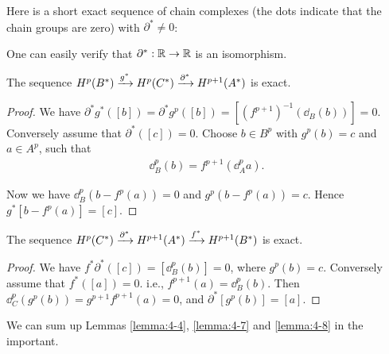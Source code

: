 \begin{example}\label{exampl:4-6}
  Here is a short exact sequence of chain complexes (the dots indicate
  that the chain groups are zero) with $\partial^*\neq 0$:

\begin{center}
\end{center}

One can easily verify that $\partial^*:\mathbb{R}\to\mathbb{R}$ is an isomorphism.
\end{example}


\begin{lemma}\label{lemma:4-7}
  The sequence $H^p(B^*)\xrightarrow[]{g^*} H^p(C^*)\xrightarrow[]{\partial^*}H^{p+1}(A^*)$ is exact.
\end{lemma}

\begin{proof}
  We have $\partial^*g^*([b]) = \partial^*g^p([b]) = [(f^{p+1})^{-1} (\dd_B(b))] = 0$. Conversely assume 
  that $\partial^*([c]) = 0$. Choose $b\in B^p$ with $g^p(b) = c$ and $a\in A^p$, such that 
  \begin{align*}
    \dd^p_B(b) = f^{p+1}(\dd^p_Aa).
  \end{align*}

  Now we have $\dd^p_B(b - f^p(a)) = 0$ and $g^p(b-f^p(a)) = c$. Hence $g^*[b-f^p(a)] = [c]$.
\end{proof}


\begin{lemma}\label{lemma:4-8}
  The sequence $H^p(C^*)\xrightarrow[]{\partial^*} H^{p+1}(A^*)\xrightarrow[]{f^*} H^{p+1}(B^*)$ is exact.
\end{lemma}

\begin{proof}
  We have $f^*\partial^*([c]) = [\dd^p_B(b)] = 0$, where $g^p(b) = c$. Conversely assume that $f^*([a]) = 0$.
i.e., $f^{p+1}(a) = \dd^p_B(b)$. Then $\dd^p_C(g^p(b)) = g^{p+1}f^{p+1}(a) = 0$, and $\partial^*[g^p(b)] = [a]$.
\end{proof}

We can sum up Lemmas \ref{lemma:4-4}, \ref{lemma:4-7} and \ref{lemma:4-8} in the important.


